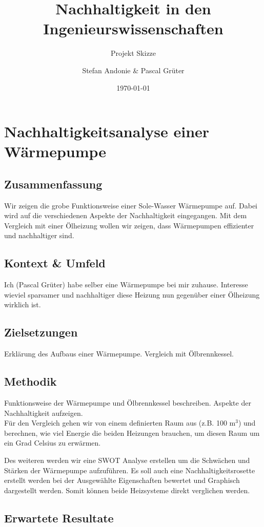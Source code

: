 \documentclass[10pt,paper=a4,final]{scrartcl}
\title{Nachhaltigkeit in den Ingenieurswissenschaften}
\subtitle{Projekt Skizze}
\author{Stefan Andonie \& Pascal Grüter}
\date{\today{}}
\begin{document}
\section*{Nachhaltigkeitsanalyse einer Wärmepumpe}

\subsection*{Zusammenfassung}

Wir zeigen die grobe Funktionsweise einer Sole-Wasser Wärmepumpe auf. Dabei wird auf die verschiedenen Aspekte der Nachhaltigkeit eingegangen. Mit dem Vergleich mit einer Ölheizung wollen wir zeigen, dass Wärmepumpen effizienter und nachhaltiger sind.

\subsection*{Kontext \& Umfeld}

Ich (Pascal Grüter) habe selber eine Wärmepumpe bei mir zuhause. Interesse wieviel sparsamer und nachhaltiger diese Heizung nun gegenüber einer Ölheizung wirklich ist.

\subsection*{Zielsetzungen}

Erklärung des Aufbaus einer Wärmepumpe.
Vergleich mit Ölbrennkessel.

\subsection*{Methodik}

Funktionsweise der Wärmepumpe und Ölbrennkessel beschreiben. Aspekte der Nachhaltigkeit aufzeigen. \\
Für den Vergleich gehen wir von einem definierten Raum aus (z.B. 100 m$^{3}$) und berechnen, wie viel Energie die beiden Heizungen brauchen, um diesen Raum um ein Grad Celsius zu erwärmen.

Des weiteren werden wir eine SWOT Analyse erstellen um die Schwächen und Stärken der Wärmepumpe aufzuführen.
Es soll auch eine Nachhaltigkeitsrosette erstellt werden bei der Ausgewählte
Eigenschaften bewertet und Graphisch dargestellt werden. Somit können beide Heizsysteme
direkt verglichen werden.


\subsection*{Erwartete Resultate}
\end{document}

